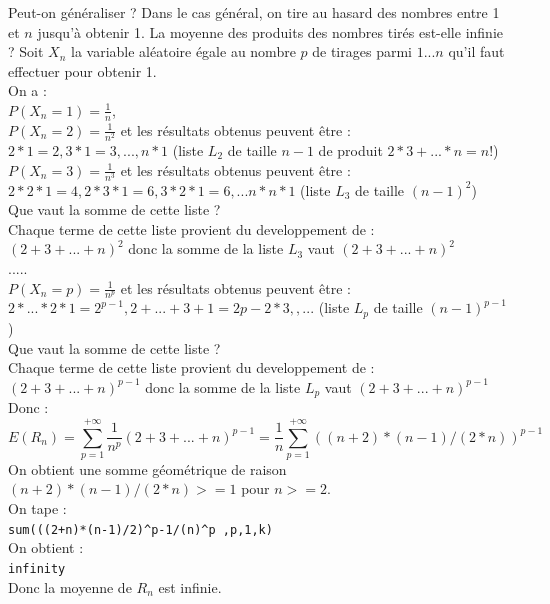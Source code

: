 \documentclass[a4paper,11pt]{book}
\begin{document}
Peut-on g\'en\'eraliser ?
Dans le cas g\'en\'eral, on tire au hasard des nombres entre 1 et $n$ jusqu'\`a
obtenir 1. La moyenne des produits des nombres tir\'es est-elle 
infinie ?
Soit $X_n$ la variable al\'eatoire \'egale au nombre $p$ de tirages parmi 
$1...n$ qu'il faut effectuer pour obtenir 1.\\
On a :\\
$\displaystyle P(X_n=1)=\frac{1}{n}$,\\
$\displaystyle P(X_n=2)=\frac{1}{n^2}$ et les r\'esultats obtenus peuvent 
\^etre : \\
$2*1=2,3*1=3,...,n*1$ (liste $L_2$ de taille $n-1$ de produit 
$2*3+...*n=n!$) \\
$\displaystyle P(X_n=3)=\frac{1}{n^3}$ et les r\'esultats obtenus peuvent 
\^etre : \\
$2*2*1=4,2*3*1=6,3*2*1=6,...n*n*1$ (liste $L_3$ de taille $(n-1)^2$)\\
Que vaut la somme de cette liste ?\\
Chaque terme de cette liste provient du developpement de :\\
$(2+3+...+n)^2$ donc la somme de la liste $L_3$ vaut $(2+3+...+n)^2$ \\
.....\\
$\displaystyle P(X_n=p)=\frac{1}{n^p}$ et les r\'esultats obtenus peuvent 
\^etre : \\
$2*...*2*1=2^{p-1},2+...+3+1=2{p-2}*3,,...$ (liste $L_p$ de 
taille $(n-1)^{p-1}$)\\
Que vaut la somme de cette liste ?\\
Chaque terme de cette liste provient du developpement de :\\
$(2+3+...+n)^{p-1}$ donc la somme de la liste $L_p$ vaut $(2+3+...+n)^{p-1}$ \\
Donc :
$$E(R_n)=\sum_{p=1}^{+\infty}\frac{1}{n^p}(2+3+...+n)^{p-1}=\frac{1}{n}\sum_{p=1}^{+\infty} ((n+2)*(n-1)/(2*n))^{p-1}$$
On obtient une somme g\'eom\'etrique de raison $(n+2)*(n-1)/(2*n)>=1$ pour 
$n>=2$.\\
On tape :\\
{\tt sum(((2+n)*(n-1)/2)\verb|^|{p-1}/(n)\verb|^|p ,p,1,k)}\\
On obtient :\\
{\tt infinity}\\
Donc la moyenne de $R_n$ est infinie.
\end{document}
